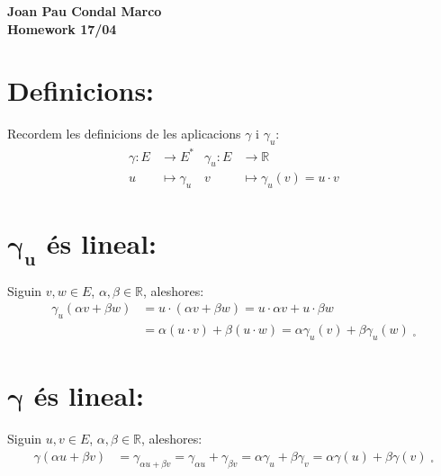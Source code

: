 \documentclass[a4paper, 12pt]{article}
\newcommand{\C}{\cdot}
\newcommand{\R}{\mathbb{R}}
\begin{document}
    \begin{center}
        \Large
        \textbf{Joan Pau Condal Marco\\Homework 17/04\\}
    \end{center}

    \large
    \section*{Definicions:}
    Recordem les definicions de les aplicacions $\gamma$ i $\gamma_u$:
    \begin{align*}
        \gamma : E &\longrightarrow E^* & \gamma_u : E &\longrightarrow \mathbb{R}\\
        u &\mapsto \gamma_u & v &\mapsto \gamma_u(v) = u \C v
    \end{align*}

    \section{$\mathbf{\gamma_u}$ \'es lineal:}
    Siguin $v,w \in E$, $\alpha, \beta \in \R$, aleshores:
    \begin{align*}
        \gamma_u (\alpha v + \beta w) &= u \C (\alpha v + \beta w) = u \C \alpha v + u \C \beta w \\
        &= \alpha (u \C v) + \beta (u \C w) = \alpha \gamma_u(v) + \beta \gamma_u(w) \;_\square
    \end{align*}

    \section{$\mathbf{\gamma}$ \'es lineal:}
    Siguin $u,v \in E$, $\alpha, \beta \in \R$, aleshores:
    \begin{align*}
        \gamma(\alpha u + \beta v) &= \gamma_{\alpha u + \beta v} = \gamma_{\alpha u} + \gamma_{\beta v} = \alpha\gamma_u + \beta\gamma_v =  \alpha\gamma(u) + \beta\gamma(v) \;_\square
    \end{align*}
\end{document}
